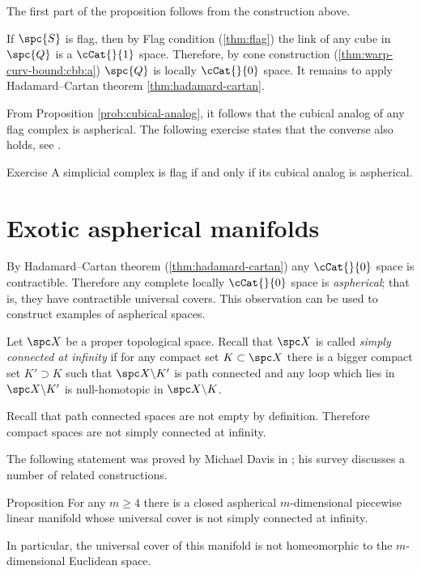The first part of the proposition follows 
from the construction above.

If ${\spc{S}}$ is flag, 
then by Flag condition (\ref{thm:flag}) 
the link of any cube in $\spc{Q}$ is a $\cCat{}{1}$ space.
Therefore, by cone construction (\ref{thm:warp-curv-bound:cbb:a})
$\spc{Q}$
is locally $\cCat{}{0}$ space.
It remains to apply Hadamard--Cartan theorem 
\ref{thm:hadamard-cartan}.
\qeds

From Proposition \ref{prob:cubical-analog}, 
it follows that the cubical analog
of any flag complex is aspherical.
The following exercise states that the  converse also holds, see \cite[5.4]{davis-survey}.

\begin{thm}{Exercise}
A simplicial complex is flag 
if and only if its cubical analog is aspherical.
\end{thm}

\section{Exotic aspherical manifolds}


By Hadamard--Cartan theorem (\ref{thm:hadamard-cartan})
any $\cCat{}{0}$ space is contractible.
Therefore any complete locally $\cCat{}{0}$ space 
is \emph{aspherical};
that is, they have contractible universal covers.
This observation can be used to construct examples of aspherical spaces. 

Let $\spc X$ be a proper topological space.
Recall that $\spc X$ is called 
\emph{simply connected at infinity} 
if for any compact set $K\subset\spc X$
there is a bigger compact set $K'\supset K$
such that  $\spc X\backslash K'$ is path connected 
and any loop which lies in $\spc X\backslash K'$
is null-homotopic in  $\spc X\backslash K$.

Recall that path connected spaces are not empty by definition.
Therefore compact spaces are not simply connected at infinity.

The following statement was proved by Michael Davis in \cite{davis-noneuclidean}; 
his survey \cite{davis-survey} discusses 
a number of related constructions.

\begin{thm}{Proposition}\label{prop:aspherical}
For any  $m\ge 4$ there is a closed aspherical 
$m$-dimensional piecewise linear manifold
whose universal cover is not simply connected at infinity.

In particular, the universal cover of this manifold 
is not homeomorphic to the $m$-dimensional Euclidean space.
\end{thm}

